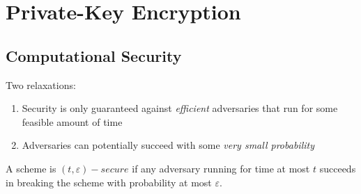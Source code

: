 \section{Private-Key Encryption}
\subsection*{Computational Security}
Two relaxations:
\begin{enumerate}
    \item Security is only guaranteed against \emph{efficient} 
    adversaries that run for some feasible amount of time
    \item Adversaries can potentially succeed
     with some \emph{very small probability}
\end{enumerate}

A scheme is $(t,\varepsilon)-secure$ if any adversary running for time at most
 $t$ succeeds in breaking the scheme with probability at most $\varepsilon$.\\
 